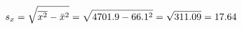 \documentclass[preview]{standalone}
\begin{document}
\begin{align*}
\special{dvisvgm:raw <g id='unique000'>}s_x = \sqrt{\overline{x^2} - \bar{x}^2} = \sqrt{4701.9 - 66.1^2} = \sqrt{311.09} = 17.64\special{dvisvgm:raw </g>}
\end{align*}
\end{document}
